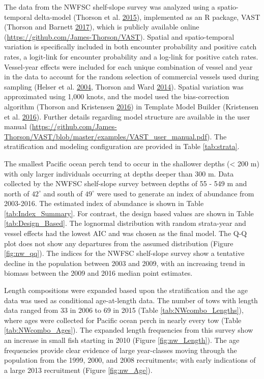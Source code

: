 \documentclass[12pt,]{article}
\begin{document}
The data from the NWFSC shelf-slope survey was analyzed using a
spatio-temporal delta-model (Thorson et al.
\protect\hyperlink{ref-thorson_geostatistical_2015}{2015}), implemented
as an R package, VAST (Thorson and Barnett
\protect\hyperlink{ref-thorson_comparing_2017}{2017}), which is publicly
available online (\url{https://github.com/James-Thorson/VAST}). Spatial
and spatio-temporal variation is specifically included in both encounter
probability and positive catch rates, a logit-link for encounter
probability and a log-link for positive catch rates. Vessel-year effects
were included for each unique combination of vessel and year in the data
to account for the random selection of commercial vessels used during
sampling (Helser et al.
\protect\hyperlink{ref-helser_generalized_2004}{2004}, Thorson and Ward
\protect\hyperlink{ref-thorson_accounting_2014}{2014}). Spatial
variation was approximated using 1,000 knots, and the model used the
bias-correction algorithm (Thorson and Kristensen
\protect\hyperlink{ref-thorson_implementing_2016}{2016}) in Template
Model Builder (Kristensen et al.
\protect\hyperlink{ref-kristensen_tmb:_2016}{2016}). Further details
regarding model structure are available in the user manual
(\url{https://github.com/James-Thorson/VAST/blob/master/examples/VAST_user_manual.pdf}).
The stratification and modeling configuration are provided in Table
\ref{tab:strata}.

The smallest Pacific ocean perch tend to occur in the shallower depths
(\textless{} 200 m) with only larger individuals occurring at depths
deeper than 300 m. Data collected by the NWFSC shelf-slope survey
between depths of 55 - 549 m and north of \(42^\circ\) and south of
\(49^\circ\) were used to generate an index of abundance from 2003-2016.
The estimated index of abundance is shown in Table
\ref{tab:Index_Summary}. For contrast, the design based values are shown
in Table \ref{tab:Design_Based}. The lognormal distribution with random
strata-year and vessel effects had the lowest AIC and was chosen as the
final model. The Q-Q plot does not show any departures from the assumed
distribution (Figure \ref{fig:nw_qq}). The indices for the NWFSC
shelf-slope survey show a tentative decline in the population between
2003 and 2009, with an increasing trend in biomass between the 2009 and
2016 median point estimates.

Length compositions were expanded based upon the stratification and the
age data was used as conditional age-at-length data. The number of tows
with length data ranged from 33 in 2006 to 69 in 2015 (Table
\ref{tab:NWcombo_Lengths}), where ages were collected for Pacific ocean
perch in nearly every tow (Table \ref{tab:NWcombo_Ages}). The expanded
length frequencies from this survey show an increase in small fish
starting in 2010 (Figure \ref{fig:nw_Length}). The age frequencies
provide clear evidence of large year-classes moving through the
population from the 1999, 2000, and 2008 recruitments; with early
indications of a large 2013 recruitment (Figure \ref{fig:nw_Age}).
\end{document}
